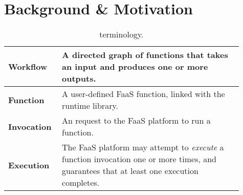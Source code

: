 \section{Background \& Motivation}\label{sec:bg}

\begin{table}
  \centering
  \begin{tabular}{|m{0.18\linewidth}|m{0.73\linewidth}|}
    \hline
  \textbf{Workflow} & A directed graph of functions that takes an input and produces one or more outputs. \\
    \hline
  \textbf{Function} & A user-defined FaaS function, linked with the \name{} runtime library. \\
    \hline
  \textbf{Invocation} & An request to the FaaS platform to run a function. \\
    \hline
  \textbf{Execution} & The FaaS platform may attempt to \emph{execute} a function invocation one or more times, and guarantees that at least one execution completes. \\
    \hline
  \end{tabular}
  \caption{\name{} terminology.}
  \label{table:terms}
\end{table}




